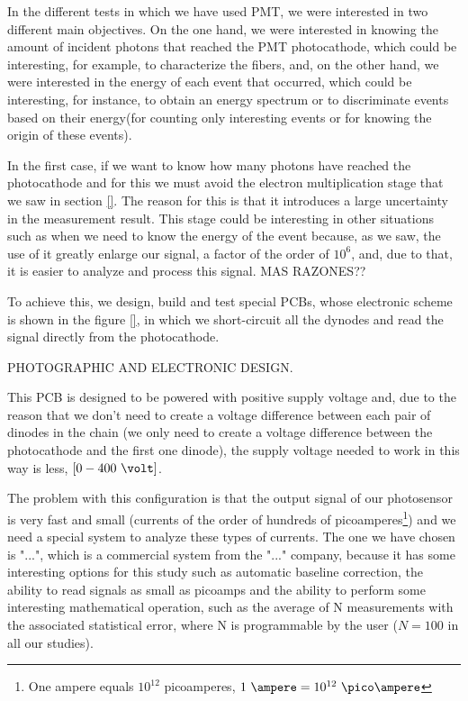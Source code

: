 In the different tests in which we have used PMT, we were interested in two different main objectives. On the one hand, we were interested in knowing the amount of incident photons that reached the PMT photocathode, which could be interesting, for example, to characterize the fibers, and, on the other hand, we were interested in the energy of each event that occurred, which could be interesting, for instance, to obtain an energy spectrum or to discriminate events based on their energy(for counting only interesting events or for knowing the origin of these events).

In the first case, if we want to know how many photons have reached the photocathode and for this we must avoid the electron multiplication stage that we saw in section \ref{}. The reason for this is that it introduces a large uncertainty in the measurement result. This stage could be interesting in other situations such as when we need to know the energy of the event because, as we saw, the use of it greatly enlarge our signal, a factor of the order of $10^6$, and, due to that, it is easier to analyze and process this signal. MAS RAZONES??

To achieve this, we design, build and test special PCBs, whose electronic scheme is shown in the figure \ref{}, in which we short-circuit all the dynodes and read the signal directly from the photocathode.

PHOTOGRAPHIC AND ELECTRONIC DESIGN.

This PCB is designed to be powered with positive supply voltage and, due to the reason that we don't need to create a voltage difference between each pair of dinodes in the chain (we only need to create a voltage difference between the photocathode and the first one dinode), the supply voltage needed to work in this way is less, $[0-400~\volt]$.

The problem with this configuration is that the output signal of our photosensor is very fast and small (currents of the order of hundreds of picoamperes\footnote{One ampere equals $10^{12}$ picoamperes, $1~\ampere=10^{12}~\pico\ampere$}) and we need a special system to analyze these types of currents. The one we have chosen is "...", which is a commercial system from the "..." company, because it has some interesting options for this study such as automatic baseline correction, the ability to read signals as small as picoamps and the ability to perform some interesting mathematical operation, such as the average of N measurements with the associated statistical error, where N is programmable by the user ($N=100$ in all our studies).

